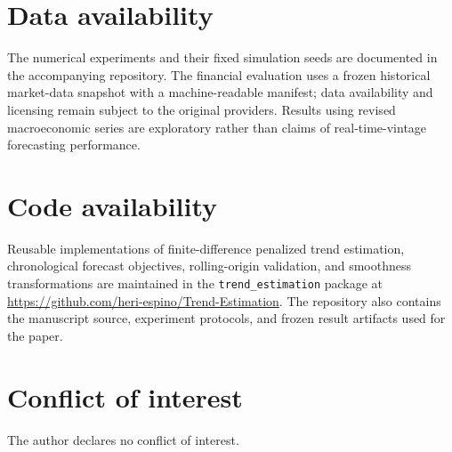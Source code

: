 \documentclass[11pt]{article}
\begin{document}
\section*{Data availability}
The numerical experiments and their fixed simulation seeds are documented in the accompanying repository. The financial evaluation uses a frozen historical market-data snapshot with a machine-readable manifest; data availability and licensing remain subject to the original providers. Results using revised macroeconomic series are exploratory rather than claims of real-time-vintage forecasting performance.

\section*{Code availability}
Reusable implementations of finite-difference penalized trend estimation, chronological forecast objectives, rolling-origin validation, and smoothness transformations are maintained in the \texttt{trend\_estimation} package at \url{https://github.com/heri-espino/Trend-Estimation}. The repository also contains the manuscript source, experiment protocols, and frozen result artifacts used for the paper.

\section*{Conflict of interest}
The author declares no conflict of interest.

\appendix





\end{document}

